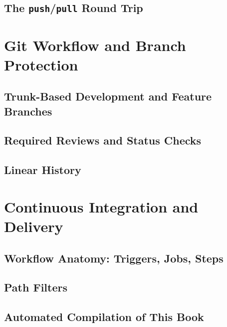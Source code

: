 
\subsection{The \texttt{push}/\texttt{pull} Round Trip}

\section{Git Workflow and Branch Protection}
\label{sec:branch-protection}

\subsection{Trunk-Based Development and Feature Branches}

\subsection{Required Reviews and Status Checks}

\subsection{Linear History}


\section{Continuous Integration and Delivery}
\label{sec:cicd}

\subsection{Workflow Anatomy: Triggers, Jobs, Steps}

\subsection{Path Filters}


\subsection{Automated Compilation of This Book}

